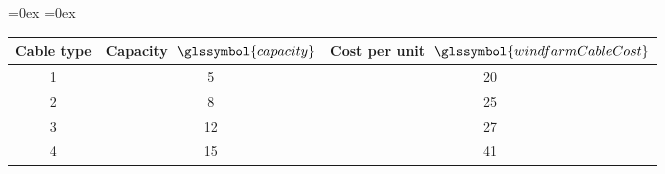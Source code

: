 \setlength{\tabcolsep}{0.2em}
\aboverulesep=0ex
\belowrulesep=0ex
\centering
\begin{tabular}{c|c|c}
% 
\toprule
	Cable type 
	& Capacity~$\glssymbol{capacity}$
	& Cost per unit~$\glssymbol{windfarmCableCost}$ \\
\midrule
\rowcolor{Table-Line-Marker}
	1 	& 5 		& 20 \\
	2 	& 8 		& 25 \\
\rowcolor{Table-Line-Marker}
	3 	& 12 	& 27 \\
	4 	& 15 	& 41 \\
\bottomrule
\end{tabular}
